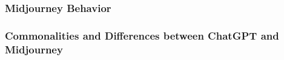 \subsubsection{Midjourney Behavior}

\subsubsection{Commonalities and Differences between ChatGPT and Midjourney}
